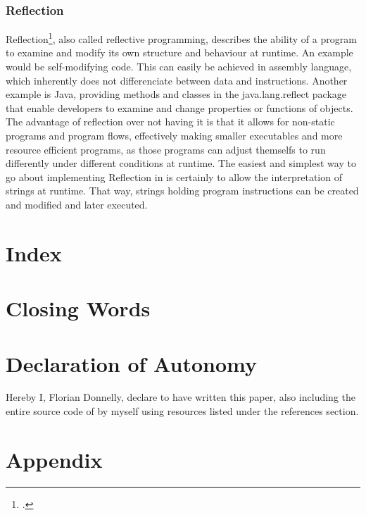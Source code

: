 \documentclass[12pt,a4paper,man]{apa7}
\begin{document}
\subsubsection{Reflection}
Reflection\footcite{reflection}, also called reflective programming, describes
the ability of a program to examine and modify its own structure and behaviour 
at runtime. An example would be self-modifying code. This can easily be
achieved in assembly language, which inherently does not differenciate between
data and instructions.
Another example is Java, providing methods and classes in the java.lang.reflect
package that enable developers to examine and change properties or functions
of objects.
The advantage of reflection over not having it is that it allows for non-static
programs and program flows, effectively making smaller executables and more
resource efficient programs, as those programs can adjust themselfs to run
differently under different conditions at runtime.
The easiest and simplest way to go about implementing Reflection in \name is
certainly to allow the interpretation of strings at runtime. That way, strings
holding program instructions can be created and modified and later executed.

\section{Index}
\section{Closing Words}
\section{Declaration of Autonomy}
Hereby I, Florian Donnelly, declare to have written this paper, also including
the entire source code of \name by myself using resources listed under the
references section.

\section{Appendix}

\newpage\printbibliography[heading=bibintoc]
\end{document}
